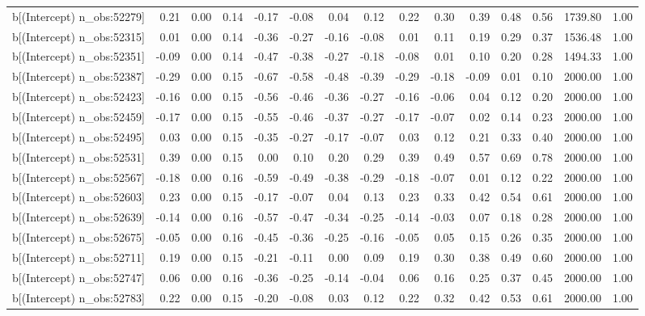 \begin{table}[ht]
\begin{tabular}{rrrrrrrrrrrrrrr}
  b[(Intercept) n\_obs:52279] & 0.21 & 0.00 & 0.14 & -0.17 & -0.08 & 0.04 & 0.12 & 0.22 & 0.30 & 0.39 & 0.48 & 0.56 & 1739.80 & 1.00 \\ 
  b[(Intercept) n\_obs:52315] & 0.01 & 0.00 & 0.14 & -0.36 & -0.27 & -0.16 & -0.08 & 0.01 & 0.11 & 0.19 & 0.29 & 0.37 & 1536.48 & 1.00 \\ 
  b[(Intercept) n\_obs:52351] & -0.09 & 0.00 & 0.14 & -0.47 & -0.38 & -0.27 & -0.18 & -0.08 & 0.01 & 0.10 & 0.20 & 0.28 & 1494.33 & 1.00 \\ 
  b[(Intercept) n\_obs:52387] & -0.29 & 0.00 & 0.15 & -0.67 & -0.58 & -0.48 & -0.39 & -0.29 & -0.18 & -0.09 & 0.01 & 0.10 & 2000.00 & 1.00 \\ 
  b[(Intercept) n\_obs:52423] & -0.16 & 0.00 & 0.15 & -0.56 & -0.46 & -0.36 & -0.27 & -0.16 & -0.06 & 0.04 & 0.12 & 0.20 & 2000.00 & 1.00 \\ 
  b[(Intercept) n\_obs:52459] & -0.17 & 0.00 & 0.15 & -0.55 & -0.46 & -0.37 & -0.27 & -0.17 & -0.07 & 0.02 & 0.14 & 0.23 & 2000.00 & 1.00 \\ 
  b[(Intercept) n\_obs:52495] & 0.03 & 0.00 & 0.15 & -0.35 & -0.27 & -0.17 & -0.07 & 0.03 & 0.12 & 0.21 & 0.33 & 0.40 & 2000.00 & 1.00 \\ 
  b[(Intercept) n\_obs:52531] & 0.39 & 0.00 & 0.15 & 0.00 & 0.10 & 0.20 & 0.29 & 0.39 & 0.49 & 0.57 & 0.69 & 0.78 & 2000.00 & 1.00 \\ 
  b[(Intercept) n\_obs:52567] & -0.18 & 0.00 & 0.16 & -0.59 & -0.49 & -0.38 & -0.29 & -0.18 & -0.07 & 0.01 & 0.12 & 0.22 & 2000.00 & 1.00 \\ 
  b[(Intercept) n\_obs:52603] & 0.23 & 0.00 & 0.15 & -0.17 & -0.07 & 0.04 & 0.13 & 0.23 & 0.33 & 0.42 & 0.54 & 0.61 & 2000.00 & 1.00 \\ 
  b[(Intercept) n\_obs:52639] & -0.14 & 0.00 & 0.16 & -0.57 & -0.47 & -0.34 & -0.25 & -0.14 & -0.03 & 0.07 & 0.18 & 0.28 & 2000.00 & 1.00 \\ 
  b[(Intercept) n\_obs:52675] & -0.05 & 0.00 & 0.16 & -0.45 & -0.36 & -0.25 & -0.16 & -0.05 & 0.05 & 0.15 & 0.26 & 0.35 & 2000.00 & 1.00 \\ 
  b[(Intercept) n\_obs:52711] & 0.19 & 0.00 & 0.15 & -0.21 & -0.11 & 0.00 & 0.09 & 0.19 & 0.30 & 0.38 & 0.49 & 0.60 & 2000.00 & 1.00 \\ 
  b[(Intercept) n\_obs:52747] & 0.06 & 0.00 & 0.16 & -0.36 & -0.25 & -0.14 & -0.04 & 0.06 & 0.16 & 0.25 & 0.37 & 0.45 & 2000.00 & 1.00 \\ 
  b[(Intercept) n\_obs:52783] & 0.22 & 0.00 & 0.15 & -0.20 & -0.08 & 0.03 & 0.12 & 0.22 & 0.32 & 0.42 & 0.53 & 0.61 & 2000.00 & 1.00 \\ 

\end{tabular}
\end{table}
